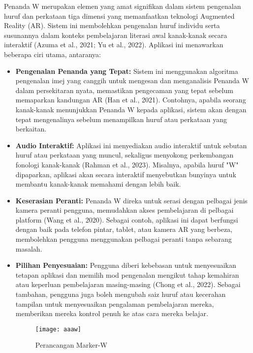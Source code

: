\begin{itemize}
\begin{itemize}
\begin{itemize}
\begin{itemize}
\begin{itemize}
Penanda W merupakan elemen yang amat signifikan dalam sistem pengenalan huruf dan perkataan tiga dimensi yang memanfaatkan teknologi Augmented Reality (AR). Sistem ini membolehkan pengenalan huruf individu serta susunannya dalam konteks pembelajaran literasi awal kanak-kanak secara interaktif (Azuma et al., 2021; Yu et al., 2022). Aplikasi ini menawarkan beberapa ciri utama, antaranya:  \\
\begin{itemize}  
\item \textbf{Pengenalan Penanda yang Tepat:} Sistem ini menggunakan algoritma pengenalan imej yang canggih untuk mengesan dan menganalisis Penanda W dalam persekitaran nyata, memastikan pengecaman yang tepat sebelum memaparkan kandungan AR (Han et al., 2021). Contohnya, apabila seorang kanak-kanak menunjukkan Penanda W kepada aplikasi, sistem akan dengan tepat mengenalinya sebelum menampilkan huruf atau perkataan yang berkaitan.  \\
\item \textbf{Audio Interaktif:} Aplikasi ini menyediakan audio interaktif untuk sebutan huruf atau perkataan yang muncul, sekaligus menyokong perkembangan fonologi kanak-kanak (Rahman et al., 2023). Misalnya, apabila huruf "W" dipaparkan, aplikasi akan secara interaktif menyebutkan bunyinya untuk membantu kanak-kanak memahami dengan lebih baik. \\ 
\item \textbf{Keserasian Peranti:} Penanda W direka untuk serasi dengan pelbagai jenis kamera peranti pengguna, memudahkan akses pembelajaran di pelbagai platform (Wang et al., 2020). Sebagai contoh, aplikasi ini dapat berfungsi dengan baik pada telefon pintar, tablet, atau kamera AR yang berbeza, membolehkan pengguna menggunakan pelbagai peranti tanpa sebarang masalah.  \\
\item \textbf{Pilihan Penyesuaian:} Pengguna diberi kebebasan untuk menyesuaikan tetapan aplikasi dan memilih mod pengenalan mengikut tahap kemahiran atau keperluan pembelajaran masing-masing (Chong et al., 2022). Sebagai tambahan, pengguna juga boleh mengubah saiz huruf atau kecerahan tampilan untuk menyesuaikan pengalaman pembelajaran mereka, memberikan mereka kontrol penuh ke atas cara mereka belajar.\\  

\clearpage
\begin{figure}[h]
     \centering
     \texttt{[image: aaaw]}
     \caption{Perancangan Marker-W}
     \label{fig:enterW}
 \end{figure}
 

\end{itemize}
\end{itemize}
\end{itemize}
\end{itemize}
\end{itemize}
\end{itemize}
